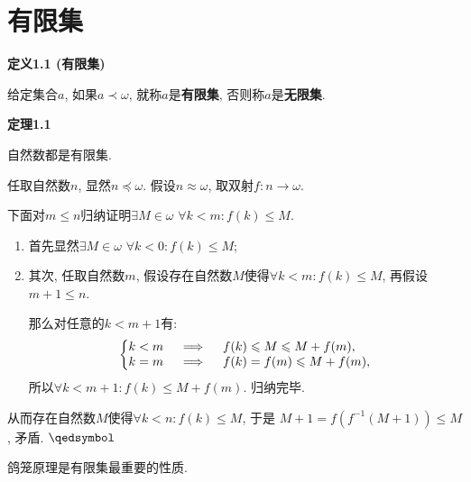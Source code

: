 \documentclass[UTF8]{ctexart}
\begin{document}
\setlength{\abovedisplayskip}{1pt}
\setlength{\belowdisplayskip}{1pt}

\section{有限集}

\hypertarget{sec:定义1.1}{}
\noindent\textbf{定义1.1 (有限集)}

给定集合$a$, 如果$a\prec\omega$, 就称$a$是\textbf{有限集}, 否则称$a$是\textbf{无限集}.

\vspace{15pt}

\hypertarget{sec:定理1.1}{}
\noindent\textbf{定理1.1}

自然数都是有限集.


任取自然数$n$, 显然$n\preccurlyeq\omega$.
假设$n\approx\omega$, 取双射$f:n\to\omega$.

\vspace{3pt}
下面对$m\leqslant n$归纳证明$\exists M\in\omega\,\,\forall k<m:f(k)\leqslant M$.

\begin{enumerate}
    \item 首先显然$\exists M\in\omega\,\,\forall k<0:f(k)\leqslant M$;
    
    \item 其次, 任取自然数$m$, 假设存在自然数$M$使得$\forall k<m:f(k)\leqslant M$,
    再假设$m+1\leqslant n$.
    
    \hspace{2.17em}
    那么对任意的$k<m+1$有:
    \vspace{3pt}
    \[\left\{\begin{aligned}
        &k<m\quad\implies\quad f(k)\leqslant M\leqslant M+f(m),\\[-3pt]
        &k=m\quad\implies\quad f(k)=f(m)\leqslant M+f(m),
    \end{aligned}\right.\\[3pt]\]
    所以$\forall k<m+1:f(k)\leqslant M+f(m)$. 归纳完毕.
\end{enumerate}

\vspace{3pt}

从而存在自然数$M$使得$\forall k<n:f(k)\leqslant M$, 于是
$M+1=f(f^{-1}(M+1))\leqslant M$, 矛盾. \hfill $\qedsymbol$

\vspace{15pt}

鸽笼原理是有限集最重要的性质.
\end{document}
